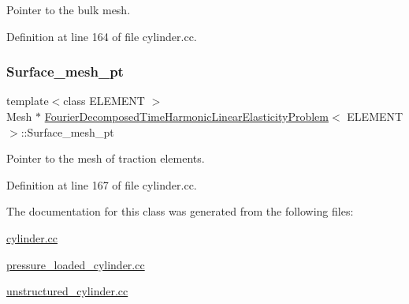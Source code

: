 Pointer to the bulk mesh. 



Definition at line 164 of file cylinder.\+cc.

\mbox{\label{classFourierDecomposedTimeHarmonicLinearElasticityProblem_aaf7a1b8aadd027cf6ed340e31fb53550}} 
\subsubsection{\texorpdfstring{Surface\+\_\+mesh\+\_\+pt}{Surface\_mesh\_pt}}
{\footnotesize\ttfamily template$<$class E\+L\+E\+M\+E\+NT $>$ \\
Mesh $\ast$ \hyperlink{classFourierDecomposedTimeHarmonicLinearElasticityProblem}{Fourier\+Decomposed\+Time\+Harmonic\+Linear\+Elasticity\+Problem}$<$ E\+L\+E\+M\+E\+NT $>$\+::Surface\+\_\+mesh\+\_\+pt\hspace{0.3cm}{\ttfamily [private]}}



Pointer to the mesh of traction elements. 



Definition at line 167 of file cylinder.\+cc.



The documentation for this class was generated from the following files\+:\begin{DoxyCompactItemize}
\item 
\hyperlink{cylinder_8cc}{cylinder.\+cc}\item 
\hyperlink{pressure__loaded__cylinder_8cc}{pressure\+\_\+loaded\+\_\+cylinder.\+cc}\item 
\hyperlink{unstructured__cylinder_8cc}{unstructured\+\_\+cylinder.\+cc}\end{DoxyCompactItemize}
